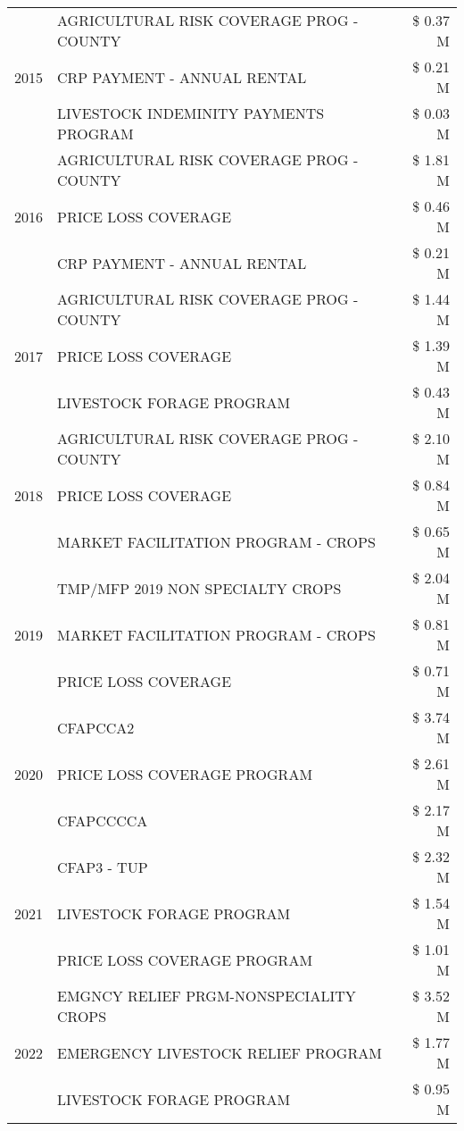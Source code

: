 \begin{tabular}{llr}
\cline{1-3}
\multirow[t]{3}{*}{2015} & AGRICULTURAL RISK COVERAGE PROG - COUNTY & \$ 0.37 M \\
 & CRP PAYMENT - ANNUAL RENTAL & \$ 0.21 M \\
 & LIVESTOCK INDEMINITY PAYMENTS PROGRAM & \$ 0.03 M \\
\cline{1-3}
\multirow[t]{3}{*}{2016} & AGRICULTURAL RISK COVERAGE PROG - COUNTY & \$ 1.81 M \\
 & PRICE LOSS COVERAGE & \$ 0.46 M \\
 & CRP PAYMENT - ANNUAL RENTAL & \$ 0.21 M \\
\cline{1-3}
\multirow[t]{3}{*}{2017} & AGRICULTURAL RISK COVERAGE PROG - COUNTY & \$ 1.44 M \\
 & PRICE LOSS COVERAGE & \$ 1.39 M \\
 & LIVESTOCK FORAGE PROGRAM & \$ 0.43 M \\
\cline{1-3}
\multirow[t]{3}{*}{2018} & AGRICULTURAL RISK COVERAGE PROG - COUNTY & \$ 2.10 M \\
 & PRICE LOSS COVERAGE & \$ 0.84 M \\
 & MARKET FACILITATION PROGRAM - CROPS & \$ 0.65 M \\
\cline{1-3}
\multirow[t]{3}{*}{2019} & TMP/MFP 2019 NON SPECIALTY CROPS & \$ 2.04 M \\
 & MARKET FACILITATION PROGRAM - CROPS & \$ 0.81 M \\
 & PRICE LOSS COVERAGE & \$ 0.71 M \\
\cline{1-3}
\multirow[t]{3}{*}{2020} & CFAPCCA2 & \$ 3.74 M \\
 & PRICE LOSS COVERAGE PROGRAM & \$ 2.61 M \\
 & CFAPCCCCA & \$ 2.17 M \\
\cline{1-3}
\multirow[t]{3}{*}{2021} & CFAP3 - TUP & \$ 2.32 M \\
 & LIVESTOCK FORAGE PROGRAM & \$ 1.54 M \\
 & PRICE LOSS COVERAGE PROGRAM & \$ 1.01 M \\
\cline{1-3}
\multirow[t]{3}{*}{2022} & EMGNCY RELIEF PRGM-NONSPECIALITY CROPS & \$ 3.52 M \\
 & EMERGENCY LIVESTOCK RELIEF PROGRAM & \$ 1.77 M \\
 & LIVESTOCK FORAGE PROGRAM & \$ 0.95 M \\
\cline{1-3}
\bottomrule
\end{tabular}
